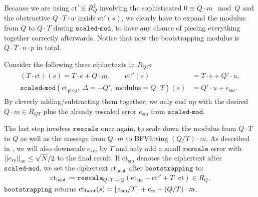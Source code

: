 \documentclass[letterpaper,10pt,english]{jupyterBook}
\begin{document}
\sphinxAtStartPar
Because we are using \(\mathrm{ct'} \in R_Q^2\) involving the sophisticated \(0 \equiv Q \cdot m \mod Q\) and the obstructive \(Q\cdot T \cdot w\) inside \(\mathrm{ct'}(s)\), we clearly have to expand the modulus from \(Q\) to \(Q\cdot T\) during \(\texttt{scaled-mod}\), to have any chance of piecing everything together correctly afterwards.
Notice that now the bootstrapping modulus is \(Q\cdot T \cdot n \cdot p\) in total.

\sphinxAtStartPar
Consider the following three ciphertexts in \(R_{QT}\):
\begin{equation*}
\begin{split}\begin{split}
(T \cdot \mathrm{ct})(s) = T \cdot e + Q \cdot m, \qquad
 \mathrm{ct}''(s) &= T\cdot e + Q' \cdot u, \\
\texttt{scaled-mod}(\mathrm{ct}_{\mathrm{prep}}, \ \Delta = -Q',\ \text{modulus} = Q\cdot T)(s) &= Q'\cdot u + e_{\text{sm}}.
\end{split}\end{split}
\end{equation*}
\sphinxAtStartPar
By cleverly adding/subtracting them together, we only end up with the desired \(Q\cdot m \in R_{QT}\) plus the already rescaled error \(e_{\text{sm}}\) from \(\texttt{scaled-mod}\).

\sphinxAtStartPar
The last step involves \(\texttt{rescale}\) once again, to scale down the modulus from \(Q\cdot T\) to \(Q\) as well as the message from \(Q\cdot m\) to BFV\sphinxhyphen{}fitting \((Q/T)\cdot m\).
As described in {\hyperref[\detokenize{Thesis:rescaling}]{}}, we will also downscale \(e_{sm}\) by \(T\) and only add a small \(\texttt{rescale}\) error with \(\left\lvert\left\lvert e_{\text{rs}} \right\rvert\right\rvert_\infty \le \sqrt{N}/2\) to the final result.
If \(\mathrm{ct}_{\text{sm}}\) denotes the ciphertext after \(\texttt{scaled-mod}\), we set the ciphertext \(\mathrm{ct}_{\text{boot}}\) after \(\texttt{bootstrapping}\) to:
\begin{equation*}
\begin{split}\mathrm{ct}_{\text{boot}} := \texttt{rescale}_{Q\cdot T \longrightarrow Q} \left(\mathrm{ct}_{\text{sm}} - \mathrm{ct''} + T \cdot \mathrm{ct} \right) \in R_Q.\end{split}
\end{equation*}
\sphinxAtStartPar
\(\texttt{bootstrapping}\) returns \(\mathrm{ct}_{\text{boot}}(s) = \left\lfloor e_{\text{sm}}/T \right\rceil + e_{\text{rs}} + (Q/T)\cdot m\).
\end{document}
